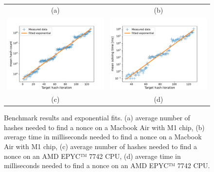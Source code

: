 \documentclass[12pt, a4paper]{article}
\begin{document}
\begin{figure}[H]
\begin{tabular}{cc}
      (a) & (b) \\[6.5pt]
      \includegraphics[width=\thisfigurewidth\textwidth]{figures/amd_hashcount.pdf} & 
      \includegraphics[width=\thisfigurewidth\textwidth]{figures/amd_solving_time.pdf} \\
      (c) & (d) \\[6.5pt]
    \end{tabular}
    \caption{Benchmark results and exponential fits. (a) average number of hashes needed to find a nonce on a Macbook Air with M1 chip, (b) average time in milliseconds needed to find a nonce on a Macbook Air with M1 chip, (c) average number of hashes needed to find a nonce on an AMD EPYC™ 7742 CPU, (d) average time in milliseconds needed to find a nonce on an AMD EPYC™ 7742 CPU.}
    \label{fig:measurements}
\end{figure}
\end{document}
